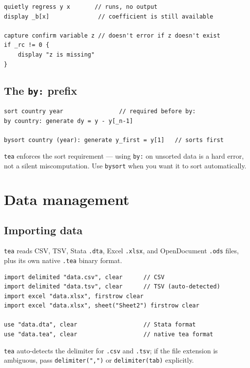 \documentclass[11pt,letterpaper]{article}
\begin{document}
\begin{lstlisting}
quietly regress y x       // runs, no output
display _b[x]              // coefficient is still available

capture confirm variable z // doesn't error if z doesn't exist
if _rc != 0 {
    display "z is missing"
}
\end{lstlisting}

\subsection{The \texttt{by:} prefix}

\begin{lstlisting}
sort country year                // required before by:
by country: generate dy = y - y[_n-1]

bysort country (year): generate y_first = y[1]   // sorts first
\end{lstlisting}

\texttt{tea} enforces the sort requirement — using \texttt{by:} on
unsorted data is a hard error, not a silent miscomputation.  Use
\texttt{bysort} when you want it to sort automatically.

\section{Data management}

\subsection{Importing data}

\texttt{tea} reads CSV, TSV, Stata \texttt{.dta}, Excel \texttt{.xlsx},
and OpenDocument \texttt{.ods} files, plus its own native \texttt{.tea}
binary format.

\begin{lstlisting}
import delimited "data.csv", clear      // CSV
import delimited "data.tsv", clear      // TSV (auto-detected)
import excel "data.xlsx", firstrow clear
import excel "data.xlsx", sheet("Sheet2") firstrow clear

use "data.dta", clear                   // Stata format
use "data.tea", clear                   // native tea format
\end{lstlisting}

\texttt{tea} auto-detects the delimiter for \texttt{.csv} and
\texttt{.tsv}; if the file extension is ambiguous, pass
\texttt{delimiter(",")} or \texttt{delimiter(tab)} explicitly.
\end{document}
